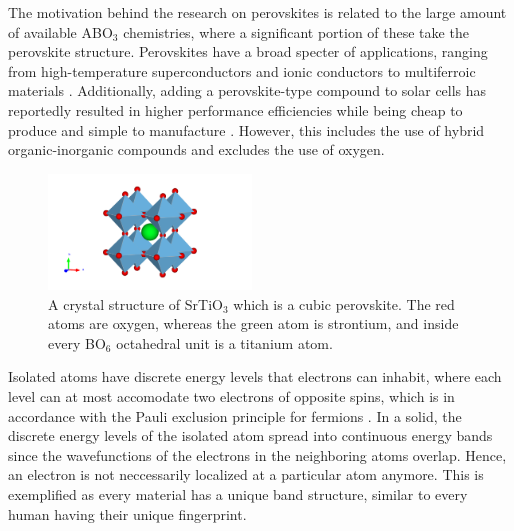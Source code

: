 The motivation behind the research on perovskites is related to the large amount of available ABO$_3$ chemistries, where a significant portion of these take the perovskite structure. Perovskites have a broad specter of applications, ranging from high-temperature superconductors \cite{Bednorz1988} and ionic conductors \cite{Boivin1998} to multiferroic materials \cite{Cheong2007}. Additionally, adding a perovskite-type compound to solar cells has reportedly resulted in higher performance efficiencies while being cheap to produce and simple to manufacture \cite{IbnMohammed2017, Chen2014}. However, this includes the use of hybrid organic-inorganic compounds and excludes the use of oxygen.


\begin{figure}
  \centering
  \includegraphics[width=0.48\textwidth]{theory/figures/SrTiO3_mp-5229_primitive.pdf}
  \caption{A crystal structure of SrTiO$_3$ which is a cubic perovskite. The red atoms are oxygen, whereas the green atom is strontium, and inside every BO$_6$ octahedral unit is a titanium atom.}
  \label{fig:perovskite}
\end{figure}

Isolated atoms have discrete energy levels that electrons can inhabit, where each level can at most accomodate two electrons of opposite spins, which is in accordance with the Pauli exclusion principle for fermions \cite{Pauli1925}. %
In a solid, the discrete energy levels of the isolated atom spread into continuous energy bands since the wavefunctions of the electrons in the neighboring atoms overlap. Hence, an electron is not neccessarily localized at a particular atom anymore. This is exemplified as every material has a unique band structure, similar to every human having their unique fingerprint.

